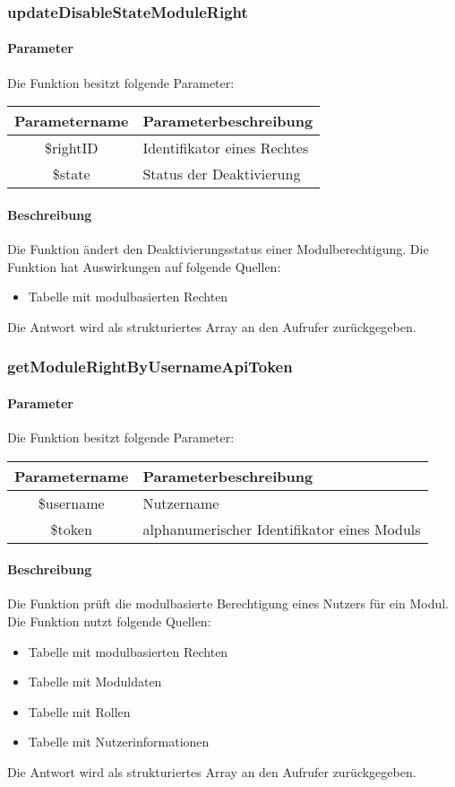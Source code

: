 \subsubsection{updateDisableStateModuleRight}
\paragraph{Parameter} Die Funktion besitzt folgende Parameter:
\begin{table}[H]
	\begin{tabular}{|c|p{11cm}|}
		\hline
		\textbf{Parametername} & \textbf{Parameterbeschreibung} \\ \hline
		\$rightID & Identifikator eines Rechtes \\ \hline
		\$state   & Status der Deaktivierung \\ \hline
	\end{tabular}
\end{table}
\paragraph{Beschreibung} Die Funktion ändert den Deaktivierungsstatus einer Modulberechtigung. Die Funktion hat Auswirkungen auf folgende Quellen:
\begin{itemize}
	\item Tabelle mit modulbasierten Rechten
\end{itemize}
Die Antwort wird als strukturiertes Array an den Aufrufer zurückgegeben.
\subsubsection{getModuleRightByUsernameApiToken}
\paragraph{Parameter} Die Funktion besitzt folgende Parameter:
\begin{table}[H]
	\begin{tabular}{|c|p{11cm}|}
		\hline
		\textbf{Parametername} & \textbf{Parameterbeschreibung} \\ \hline
		\$username & Nutzername \\ \hline
		\$token    & alphanumerischer Identifikator eines Moduls \\ \hline
	\end{tabular}
\end{table}
\paragraph{Beschreibung} Die Funktion prüft die modulbasierte Berechtigung eines Nutzers für ein Modul. Die Funktion nutzt folgende Quellen:
\begin{itemize}
	\item Tabelle mit modulbasierten Rechten
	\item Tabelle mit Moduldaten
	\item Tabelle mit Rollen
	\item Tabelle mit Nutzerinformationen
\end{itemize}
Die Antwort wird als strukturiertes Array an den Aufrufer zurückgegeben.